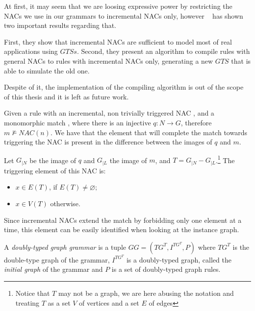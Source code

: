 At first, it may seem that we are loosing expressive power by restricting the NACs we use in our grammars to incremental NACs only, however ~\cite{Corradini2013} has shown two important results regarding that.

First, they show that incremental NACs are sufficient to model most of real applications using $GTSs$. Second, they present an algorithm to compile rules with general NACs to rules with incremental NACs only, generating a new $GTS$ that is able to simulate the old one.

Despite of it, the implementation of the compiling algorithm is out of the scope of this thesis and it is left as future work.

\begin{definition} Given a rule \graphrule{} with an incremental, non trivially triggered NAC \nac{}, and a monomorphic match \match{}, where there is an injective $q : N \rightarrow G$, therefore $m \not\models NAC(n)$. We have that the element that will complete the match towards triggering the NAC is present in the difference between the images of $q$ and $m$.

  Let $G_{|N}$ be the image of $q$ and $G_{|L}$ the image of $m$, and \mbox{$T = G_{|N} - G_{|L}$}.\footnote{Notice that $T$ may not be a graph, we are here abusing the notation and treating $T$ as a set $V$ of vertices and a set $E$ of edges} The triggering element of this NAC is:

  \begin{itemize}
    \item $x \in E(T)$, if $E(T) \neq \varnothing$;
    \item $x \in V(T)$ otherwise.
  \end{itemize} 
\end{definition}

\begin{example}
Since incremental NACs extend the match by forbidding only one element at a time, this element can be easily identified when looking at the instance graph.
\end{example}

\begin{definition} A \emph{doubly-typed graph grammar} is a tuple $GG = \left(TG^T, I^{TG^T},P \right)$ where $TG^T$ is the double-type graph of the grammar, $I^{TG^T}$ is a doubly-typed graph, called the \emph{initial graph} of the grammar and $P$ is a set of doubly-typed graph rules.
\end{definition}


